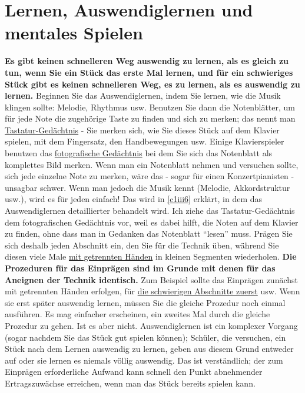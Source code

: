 

\section{Lernen, Auswendiglernen und mentales Spielen}
\label{c1ii12}

\textbf{Es gibt keinen schnelleren Weg auswendig zu lernen, als es gleich zu tun, wenn Sie ein Stück das erste Mal lernen, und für ein schwieriges Stück gibt es keinen schnelleren Weg, es zu lernen, als es auswendig zu lernen.}
Beginnen Sie das Auswendiglernen, indem Sie lernen, wie die Musik klingen sollte: Melodie, Rhythmus usw.
Benutzen Sie dann die Notenblätter, um für jede Note die zugehörige Taste zu finden und sich zu merken; das nennt man \hyperref[c1iii6tastatur]{Tastatur-Gedächtnis} - Sie merken sich, wie Sie dieses Stück auf dem Klavier spielen, mit dem Fingersatz, den Handbewegungen usw.
Einige Klavierspieler benutzen das \hyperref[c1iii6foto]{fotografische Gedächtnis} bei dem Sie sich das Notenblatt als komplettes Bild merken.
Wenn man ein Notenblatt nehmen und versuchen sollte, sich jede einzelne Note zu merken, wäre das - sogar für einen Konzertpianisten - unsagbar schwer.
Wenn man jedoch die Musik kennt (Melodie, Akkordstruktur usw.), wird es für jeden einfach!
Das wird in \hyperref[c1iii6]{\ref*{c1iii6}} erklärt, in dem das Auswendiglernen detaillierter behandelt wird.
Ich ziehe das Tastatur-Gedächtnis dem fotografischen Gedächtnis vor, weil es dabei hilft, die Noten auf dem Klavier zu finden, ohne dass man in Gedanken das Notenblatt \enquote{lesen} muss.
Prägen Sie sich deshalb jeden Abschnitt ein, den Sie für die Technik üben, während Sie diesen viele Male \hyperref[c1ii7]{mit getrennten Händen} in kleinen Segmenten wiederholen.
\textbf{Die Prozeduren für das Einprägen sind im Grunde mit denen für das Aneignen der Technik identisch.}
Zum Beispiel sollte das Einprägen zunächst mit getrennten Händen erfolgen, für \hyperref[c1ii5]{die schwierigen Abschnitte zuerst} usw.
Wenn sie erst später auswendig lernen, müssen Sie die gleiche Prozedur noch einmal ausführen.
Es mag einfacher erscheinen, ein zweites Mal durch die gleiche Prozedur zu gehen.
Ist es aber nicht.
Auswendiglernen ist ein komplexer Vorgang (sogar nachdem Sie das Stück gut spielen können); Schüler, die versuchen, ein Stück nach dem Lernen auswendig zu lernen, geben aus diesem Grund entweder auf oder sie lernen es niemals völlig auswendig.
Das ist verständlich; der zum Einprägen erforderliche Aufwand kann schnell den Punkt abnehmender Ertragszuwächse erreichen, wenn man das Stück bereits spielen kann.

